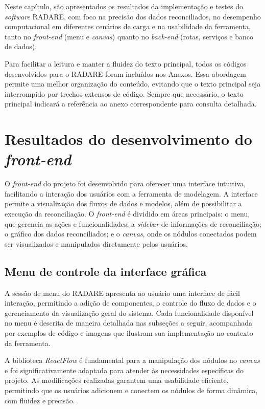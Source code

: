 \label{Cap:Resultados}

Neste capítulo, são apresentados os resultados da implementação e testes do \textit{software} RADARE, com foco na precisão dos dados reconciliados, no desempenho computacional em diferentes cenários de carga e na usabilidade da ferramenta, tanto no \textit{front-end} (menu e \textit{canvas}) quanto no \textit{back-end} (rotas, serviços e banco de dados).

Para facilitar a leitura e manter a fluidez do texto principal, todos os códigos desenvolvidos para o RADARE foram incluídos nos Anexos. Essa abordagem permite uma melhor organização do conteúdo, evitando que o texto principal seja interrompido por trechos extensos de código. Sempre que necessário, o texto principal indicará a referência ao anexo correspondente para consulta detalhada.

\section{Resultados do desenvolvimento do \textit{front-end}}

O \textit{front-end} do projeto foi desenvolvido para oferecer uma interface intuitiva, facilitando a interação dos usuários com a ferramenta de modelagem. A interface permite a visualização dos fluxos de dados e modelos, além de possibilitar a execução da reconciliação. O \textit{front-end} é dividido em áreas principais: o menu, que gerencia as ações e funcionalidades; a \textit{sidebar} de informações de reconciliação; o gráfico dos dados reconciliados; e o \textit{canvas}, onde os nódulos conectados podem ser visualizados e manipulados diretamente pelos usuários.

\subsection{Menu de controle da interface gráfica} 

A sessão de menu do RADARE apresenta ao usuário uma interface de fácil interação, permitindo a adição de componentes, o controle do fluxo de dados e o gerenciamento da visualização geral do sistema. Cada funcionalidade disponível no menu é descrita de maneira detalhada nas subseções a seguir, acompanhada por exemplos de código e imagens que ilustram sua implementação no contexto da ferramenta.

A biblioteca \textit{ReactFlow} \cite{reactflow} é fundamental para a manipulação dos nódulos no \textit{canvas} e foi significativamente adaptada para atender às necessidades específicas do projeto. As modificações realizadas garantem uma usabilidade eficiente, permitindo que os usuários adicionem e conectem os nódulos de forma dinâmica, com fluidez e precisão.

